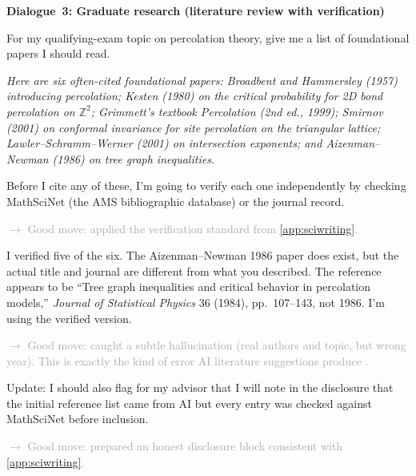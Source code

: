 \documentclass{SIAMbook2023}
\newenvironment{dialogue}[1]%
  {\par\medskip\noindent\textbf{\textcolor{guideblue}{#1}}\par\smallskip
   \begin{list}{}{\setlength{\leftmargin}{1.5em}\setlength{\rightmargin}{0.5em}\setlength{\itemsep}{0.4em}\setlength{\topsep}{0pt}}}
  {\end{list}\par\medskip}
\newcommand{\studentturn}[1]{\item[\textbf{Student.}] #1}
\newcommand{\aiturn}[1]{\item[\textbf{AI.}] \textit{#1}}
\newcommand{\dialogueannotate}[1]{\par\smallskip\hspace{2em}\textcolor{darkgray}{\footnotesize\textsf{$\rightarrow$ #1}}\par}
\begin{document}
\begin{dialogue}{Dialogue~3: Graduate research (literature review with verification)}
\studentturn{For my qualifying-exam topic on percolation theory, give me a list of foundational papers I should read.}

\aiturn{Here are six often-cited foundational papers: Broadbent and Hammersley (1957) introducing percolation; Kesten (1980) on the critical probability for 2D bond percolation on $\mathbb{Z}^2$; Grimmett's textbook \emph{Percolation} (2nd ed., 1999); Smirnov (2001) on conformal invariance for site percolation on the triangular lattice; Lawler--Schramm--Werner (2001) on intersection exponents; and Aizenman--Newman (1986) on tree graph inequalities.}

\studentturn{Before I cite any of these, I'm going to verify each one independently by checking MathSciNet (the AMS bibliographic database) or the journal record.}
\dialogueannotate{Good move: applied the verification standard from \cref{app:sciwriting}.}

\studentturn{[Several minutes later.] I verified five of the six. The Aizenman--Newman 1986 paper does exist, but the actual title and journal are different from what you described. The reference appears to be ``Tree graph inequalities and critical behavior in percolation models,'' \emph{Journal of Statistical Physics} 36 (1984), pp.~107--143, not 1986. I'm using the verified version.}
\dialogueannotate{Good move: caught a subtle hallucination (real authors and topic, but wrong year). This is exactly the kind of error AI literature suggestions produce \citep{walters2023fabrication}.}

\studentturn{Update: I should also flag for my advisor that I will note in the disclosure that the initial reference list came from AI but every entry was checked against MathSciNet before inclusion.}
\dialogueannotate{Good move: prepared an honest disclosure block consistent with \cref{app:sciwriting}.}
\end{dialogue}
\end{document}
